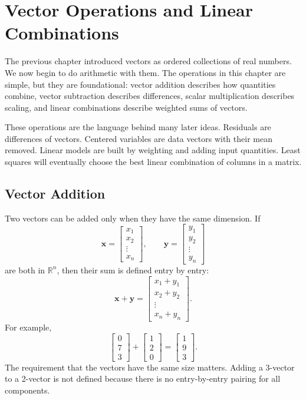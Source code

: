 \chapter{Vector Operations and Linear Combinations}
\label{mf:ch03-vector-operations-linear-combinations}

The previous chapter introduced vectors as ordered collections of real numbers. We now begin to do arithmetic with them. The operations in this chapter are simple, but they are foundational: vector addition describes how quantities combine, vector subtraction describes differences, scalar multiplication describes scaling, and linear combinations describe weighted sums of vectors.

These operations are the language behind many later ideas. Residuals are differences of vectors. Centered variables are data vectors with their mean removed. Linear models are built by weighting and adding input quantities. Least squares will eventually choose the best linear combination of columns in a matrix.

\section{Vector Addition}
\label{mf:vector-arithmetic}
\label{mf:vector-addition}

Two vectors can be added only when they have the same dimension. If
\[
\mathbf{x}=\begin{bmatrix}x_1\\x_2\\\vdots\\x_n\end{bmatrix},
\qquad
\mathbf{y}=\begin{bmatrix}y_1\\y_2\\\vdots\\y_n\end{bmatrix}
\]
are both in \(\mathbb{R}^n\), then their sum is defined entry by entry:
\[
\mathbf{x}+\mathbf{y}
=
\begin{bmatrix}
x_1+y_1\\
x_2+y_2\\
\vdots\\
x_n+y_n
\end{bmatrix}.
\]
For example,
\[
\begin{bmatrix}0\\7\\3\end{bmatrix}
+
\begin{bmatrix}1\\2\\0\end{bmatrix}
=
\begin{bmatrix}1\\9\\3\end{bmatrix}.
\]
The requirement that the vectors have the same size matters. Adding a 3-vector to a 2-vector is not defined because there is no entry-by-entry pairing for all components.

